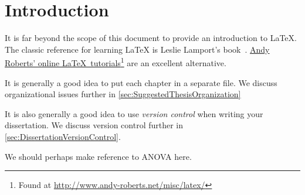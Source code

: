 \chapter{Introduction}
\label{ch:Introduction}

It is far beyond the scope of this document to provide an introduction
to LaTeX. 
The classic reference for learning LaTeX is Leslie Lamport's
book~\cite{lamport-1994-ladps}.
\href{http://www.andy-roberts.net/misc/latex/}{Andy Roberts' online
\LaTeX\ tutorials}\footnote{%
    Found at \url{http://www.andy-roberts.net/misc/latex/}}
are an excellent alternative.

It is generally a good idea to put each chapter in a separate file.
We discuss organizational issues further in
\autoref{sec:SuggestedThesisOrganization}

It is also generally a good idea to use \emph{version control}
when writing your dissertation.  We discuss version control further
in \autoref{sec:DissertationVersionControl}.

We should perhaps make reference to \ac{ANOVA} here.

\endinput

Any text after an \endinput is ignored.
You could put scraps here or things in progress.
